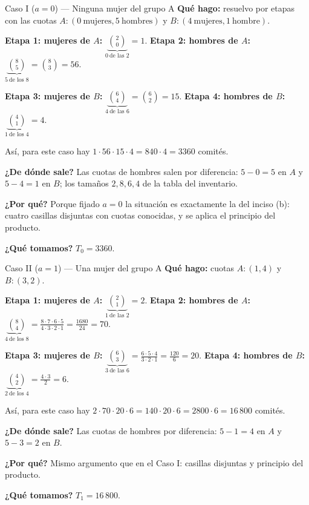 \documentclass[11pt]{article}
\begin{document}
\begin{paso}{Caso I ($a=0$) --- Ninguna mujer del grupo A}
\textbf{Qu\'e hago:} resuelvo por etapas con las cuotas $A:(0\ \text{mujeres},5\ \text{hombres})$ y
$B:(4\ \text{mujeres},1\ \text{hombre})$.

\medskip
\textbf{Etapa 1: mujeres de $A$:} $\displaystyle \underbrace{\binom{2}{0}}_{0\ \text{de las 2}}=1$.\quad
\textbf{Etapa 2: hombres de $A$:} $\displaystyle \underbrace{\binom{8}{5}}_{5\ \text{de los 8}}=\binom{8}{3}=56$.

\medskip
\textbf{Etapa 3: mujeres de $B$:} $\displaystyle \underbrace{\binom{6}{4}}_{4\ \text{de las 6}}=\binom{6}{2}=15$.\quad
\textbf{Etapa 4: hombres de $B$:} $\displaystyle \underbrace{\binom{4}{1}}_{1\ \text{de los 4}}=4$.

\medskip
As\'i, para este caso hay $1\cdot 56\cdot 15\cdot 4 = 840\cdot 4 = 3360$ comit\'es.

\textbf{¿De d\'onde sale?} Las cuotas de hombres salen por diferencia: $5-0=5$ en $A$ y $5-4=1$ en $B$; los
tama\~nos $2,8,6,4$ de la tabla del inventario.

\textbf{¿Por qu\'e?} Porque fijado $a=0$ la situaci\'on es exactamente la del inciso (b): cuatro casillas
disjuntas con cuotas conocidas, y se aplica el principio del producto.

\textbf{¿Qu\'e tomamos?} $T_0=3360$.
\end{paso}

\begin{paso}{Caso II ($a=1$) --- Una mujer del grupo A}
\textbf{Qu\'e hago:} cuotas $A:(1,4)$ y $B:(3,2)$.

\medskip
\textbf{Etapa 1: mujeres de $A$:} $\displaystyle \underbrace{\binom{2}{1}}_{1\ \text{de las 2}}=2$.\quad
\textbf{Etapa 2: hombres de $A$:} $\displaystyle \underbrace{\binom{8}{4}}_{4\ \text{de los 8}}=\frac{8\cdot 7\cdot 6\cdot 5}{4\cdot 3\cdot 2\cdot 1}=\frac{1680}{24}=70$.

\medskip
\textbf{Etapa 3: mujeres de $B$:} $\displaystyle \underbrace{\binom{6}{3}}_{3\ \text{de las 6}}=\frac{6\cdot 5\cdot 4}{3\cdot 2\cdot 1}=\frac{120}{6}=20$.\quad
\textbf{Etapa 4: hombres de $B$:} $\displaystyle \underbrace{\binom{4}{2}}_{2\ \text{de los 4}}=\frac{4\cdot 3}{2}=6$.

\medskip
As\'i, para este caso hay $2\cdot 70\cdot 20\cdot 6 = 140\cdot 20\cdot 6 = 2800\cdot 6 = 16\,800$ comit\'es.

\textbf{¿De d\'onde sale?} Las cuotas de hombres por diferencia: $5-1=4$ en $A$ y $5-3=2$ en $B$.

\textbf{¿Por qu\'e?} Mismo argumento que en el Caso I: casillas disjuntas y principio del producto.

\textbf{¿Qu\'e tomamos?} $T_1=16\,800$.
\end{paso}
\end{document}
